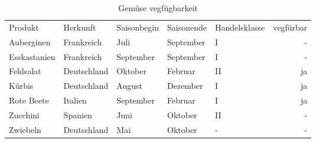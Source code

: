 \documentclass [12pt]{scrartcl}
\begin{document}
 \begin{table}[htbp]
  \begin{center}
    \caption{Gemüse vegfügbarkeit}
    \centering

    \begin{tabular}{ *{5}{l} *{1}{r}}
	\toprule

	\multicolumn{1}{l}{Produkt} & \multicolumn{1}{l}{Herkunft}  
	& \multicolumn{1}{l}{Saisonbegin} & \multicolumn{1}{l}{Saisonende} 
	& \multicolumn{1}{l}{Handelsklasse} & \multicolumn{1}{r}{vegfürbar} \\
	
	\cmidrule(lr){1-6}
	Auberginen & Frankreich & Juli & September & I & -  \\
	\cmidrule(lr){1-6}
	Esskastanien & Frankreich & September & September & I & - \\ 
	\cmidrule(lr){1-6}
	Feldsalat & Deutschland & Oktober & Februar & II & ja \\
	\cmidrule(lr){1-6}
	Kürbis & Deutschland & August & Dezember & I & ja \\
	\cmidrule(lr){1-6}
	Rote Beete & Italien & September & Februar & I  & ja \\
	\cmidrule(lr){1-6}
	Zucchini & Spanien & Juni & Oktober & II & - \\
	\cmidrule(lr){1-6}
	Zwiebeln & Deutschland & Mai & Oktober & -  & - \\
	\bottomrule
    \end{tabular}

  \end{center}
 \end{table}
\end{document}

